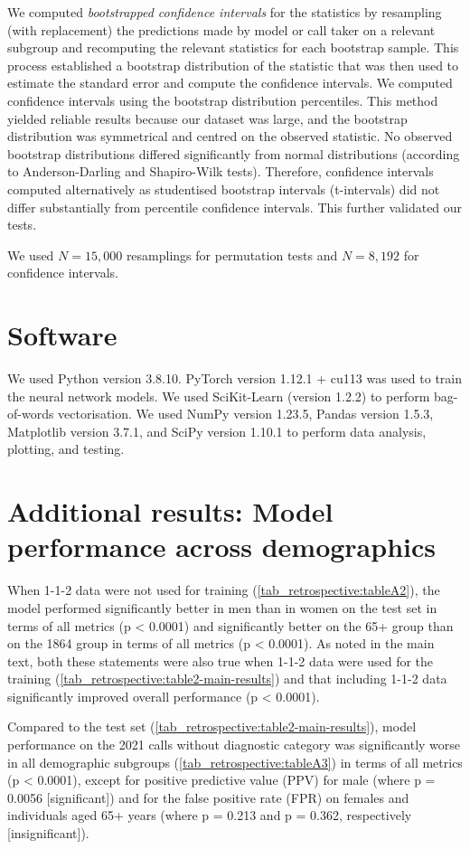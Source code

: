 {We computed \emph{bootstrapped confidence intervals} for the statistics by resampling (with replacement) the predictions made by model or call taker on a relevant subgroup and recomputing the relevant statistics for each bootstrap sample. This process established a bootstrap distribution of the statistic that was then used to estimate the standard error and compute the confidence intervals. We computed confidence intervals using the bootstrap distribution percentiles. This method yielded reliable results because our dataset was large, and the bootstrap distribution was symmetrical and centred on the observed statistic. No observed bootstrap distributions differed significantly from normal distributions (according to Anderson-Darling and Shapiro-Wilk tests). Therefore, confidence intervals computed alternatively as studentised bootstrap intervals (t-intervals) did not differ substantially from percentile confidence intervals. This further validated our tests.

We used $N=15,000$ resamplings for permutation tests and $N=8,192$ for confidence intervals.


\section{Software}

We used Python version 3.8.10. PyTorch version 1.12.1 + cu113 was used to train the neural network models. We used SciKit-Learn (version 1.2.2) to perform bag-of-words vectorisation. We used NumPy version 1.23.5, Pandas version 1.5.3, Matplotlib version 3.7.1, and SciPy version 1.10.1 to perform data analysis, plotting, and testing.


\section{Additional results: Model performance across demographics}

When 1-1-2 data were not used for training (\cref{tab_retrospective:tableA2}), the model performed significantly better in men than in women on the test set in terms of all metrics (p < 0.0001) and significantly better on the 65+ group than on the 1864 group in terms of all metrics (p < 0.0001). As noted in the main text, both these statements were also true when 1-1-2 data were used for the training (\cref{tab_retrospective:table2-main-results}) and that including 1-1-2 data significantly improved overall performance (p < 0.0001).

Compared to the test set (\cref{tab_retrospective:table2-main-results}), model performance on the 2021 calls without diagnostic category was significantly worse in all demographic subgroups (\cref{tab_retrospective:tableA3}) in terms of all metrics (p < 0.0001), except for positive predictive value (PPV) for male (where p = 0.0056 [significant]) and for the false positive rate (FPR) on females and individuals aged 65+ years (where p = 0.213 and p = 0.362, respectively [insignificant]).

}
